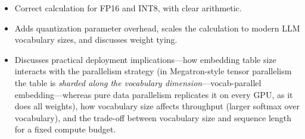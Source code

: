 \begin{interviewq}

\goodgreat
\begin{itemize}
    \item {} Correct calculation for FP16 and INT8, with clear arithmetic.
    \item {} Adds quantization parameter overhead, scales the calculation to modern LLM vocabulary sizes, and discusses weight tying.
    \item {} Discusses practical deployment implications---how embedding table size interacts with the parallelism strategy (in Megatron-style tensor parallelism the table is \textit{sharded along the vocabulary dimension}---vocab-parallel embedding---whereas pure data parallelism replicates it on every GPU, as it does all weights), how vocabulary size affects throughput (larger softmax over vocabulary), and the trade-off between vocabulary size and sequence length for a fixed compute budget.
\end{itemize}

\end{interviewq}


